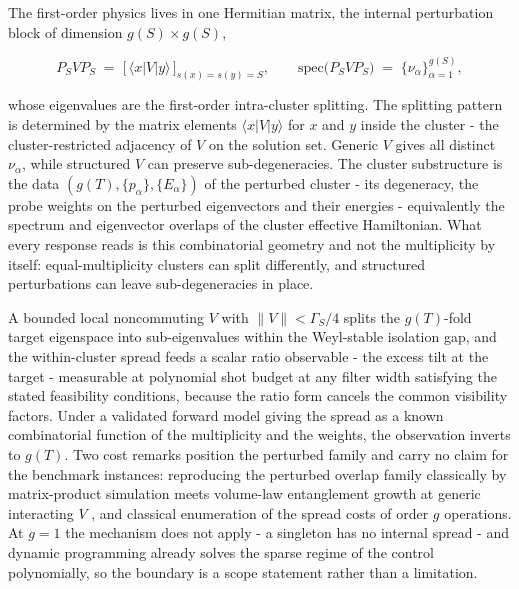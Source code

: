 The first-order physics lives in one Hermitian matrix, the internal perturbation block of dimension $g(S) \times g(S)$,
\begin{widetext}
\[
P_S V P_S \;=\; \bigl[\, \langle x | V | y \rangle \,\bigr]_{s(x) = s(y) = S}, \qquad \mathrm{spec}\bigl(P_S V P_S\bigr) \;=\; \{\nu_\alpha\}_{\alpha=1}^{g(S)},
\]
\end{widetext}
whose eigenvalues are the first-order intra-cluster splitting. The splitting pattern is determined by the matrix elements $\langle x|V|y\rangle$ for $x$ and $y$ inside the cluster - the cluster-restricted adjacency of $V$ on the solution set. Generic $V$ gives all distinct $\nu_\alpha$, while structured $V$ can preserve sub-degeneracies. The cluster substructure is the data $(g(T), \{p_\alpha\}, \{E_\alpha\})$ of the perturbed cluster - its degeneracy, the probe weights on the perturbed eigenvectors and their energies - equivalently the spectrum and eigenvector overlaps of the cluster effective Hamiltonian. What every response reads is this combinatorial geometry and not the multiplicity by itself: equal-multiplicity clusters can split differently, and structured perturbations can leave sub-degeneracies in place.

A bounded local noncommuting $V$ with $\|V\| < \Gamma_S/4$ splits the $g(T)$-fold target eigenspace into sub-eigenvalues within the Weyl-stable isolation gap, and the within-cluster spread feeds a scalar ratio observable - the excess tilt at the target - measurable at polynomial shot budget at any filter width satisfying the stated feasibility conditions, because the ratio form cancels the common visibility factors. Under a validated forward model giving the spread as a known combinatorial function of the multiplicity and the weights, the observation inverts to $g(T)$. Two cost remarks position the perturbed family and carry no claim for the benchmark instances: reproducing the perturbed overlap family classically by matrix-product simulation meets volume-law entanglement growth at generic interacting $V$ \cite{calabrese2005evolution,eisert2010area,schollwock2011density,pal2010mbl}, and classical enumeration of the spread costs of order $g$ operations. At $g = 1$ the mechanism does not apply - a singleton has no internal spread - and dynamic programming already solves the sparse regime of the control polynomially, so the boundary is a scope statement rather than a limitation.

